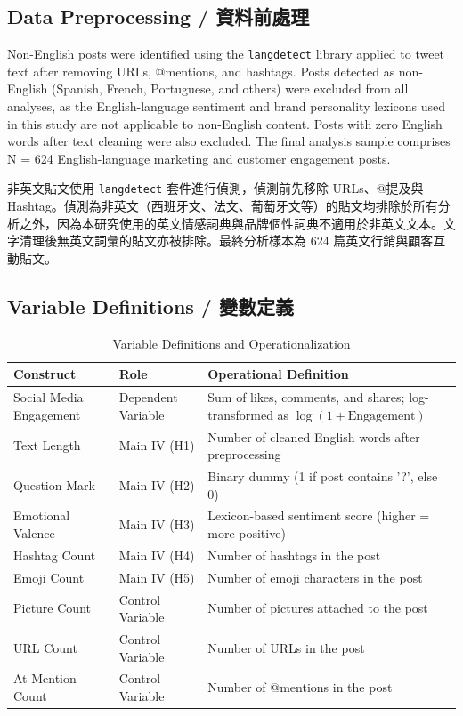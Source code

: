 \documentclass[12pt,a4paper]{article}
\begin{document}
\subsection{Data Preprocessing / 資料前處理}

Non-English posts were identified using the \texttt{langdetect} library applied to tweet text after removing URLs, @mentions, and hashtags. Posts detected as non-English (Spanish, French, Portuguese, and others) were excluded from all analyses, as the English-language sentiment and brand personality lexicons used in this study are not applicable to non-English content. Posts with zero English words after text cleaning were also excluded. The final analysis sample comprises N = 624 English-language marketing and customer engagement posts.

非英文貼文使用 \texttt{langdetect} 套件進行偵測，偵測前先移除 URLs、@提及與 Hashtag。偵測為非英文（西班牙文、法文、葡萄牙文等）的貼文均排除於所有分析之外，因為本研究使用的英文情感詞典與品牌個性詞典不適用於非英文文本。文字清理後無英文詞彙的貼文亦被排除。最終分析樣本為 624 篇英文行銷與顧客互動貼文。

\subsection{Variable Definitions / 變數定義}

\begin{table}[H]
\centering
\caption{Variable Definitions and Operationalization}
\small
\begin{tabular}{@{}p{} p{} p{}@{}}
\toprule
Construct & Role & Operational Definition \\
\midrule
Social Media Engagement & Dependent Variable & Sum of likes, comments, and shares; log-transformed as $\log(1+\text{Engagement})$ \\
\midrule
Text Length & Main IV (H1) & Number of cleaned English words after preprocessing \\
Question Mark & Main IV (H2) & Binary dummy (1 if post contains '?', else 0) \\
Emotional Valence & Main IV (H3) & Lexicon-based sentiment score (higher = more positive) \\
Hashtag Count & Main IV (H4) & Number of hashtags in the post \\
Emoji Count & Main IV (H5) & Number of emoji characters in the post \\
\midrule
Picture Count & Control Variable & Number of pictures attached to the post \\
URL Count & Control Variable & Number of URLs in the post \\
At-Mention Count & Control Variable & Number of @mentions in the post \\
\bottomrule
\end{tabular}
\end{table}
\end{document}
